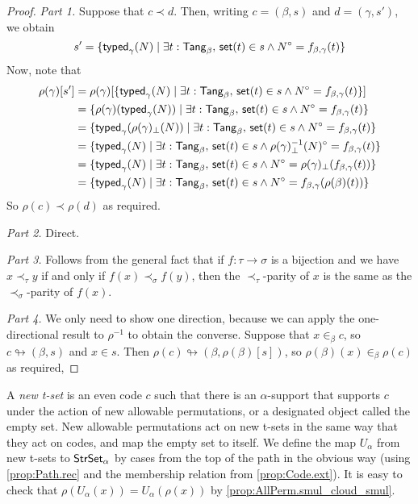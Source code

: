 \begin{proof}
  \emph{Part 1.}
  Suppose that \( c \prec d \).
  Then, writing \( c = (\beta, s) \) and \( d = (\gamma, s') \), we obtain
  \[ s' = \{ \operatorname{\mathsf{typed}}_\gamma(N) \mid \exists t : \mathsf{Tang}_\beta,\, \operatorname{\mathsf{set}}(t) \in s \wedge N^\circ = f_{\beta,\gamma}(t) \} \]
  Now, note that
  \begin{align*}
    \rho(\gamma)[s']
    &= \rho(\gamma)[\{ \operatorname{\mathsf{typed}}_\gamma(N) \mid \exists t : \mathsf{Tang}_\beta,\, \operatorname{\mathsf{set}}(t) \in s \wedge N^\circ = f_{\beta,\gamma}(t) \}] \\
    &= \{ \rho(\gamma)(\operatorname{\mathsf{typed}}_\gamma(N)) \mid \exists t : \mathsf{Tang}_\beta,\, \operatorname{\mathsf{set}}(t) \in s \wedge N^\circ = f_{\beta,\gamma}(t) \} \\
    &= \{ \operatorname{\mathsf{typed}}_\gamma(\rho(\gamma)_\bot(N)) \mid \exists t : \mathsf{Tang}_\beta,\, \operatorname{\mathsf{set}}(t) \in s \wedge N^\circ = f_{\beta,\gamma}(t) \} \\
    &= \{ \operatorname{\mathsf{typed}}_\gamma(N) \mid \exists t : \mathsf{Tang}_\beta,\, \operatorname{\mathsf{set}}(t) \in s \wedge \rho(\gamma)_\bot^{-1}(N)^\circ = f_{\beta,\gamma}(t) \} \\
    &= \{ \operatorname{\mathsf{typed}}_\gamma(N) \mid \exists t : \mathsf{Tang}_\beta,\, \operatorname{\mathsf{set}}(t) \in s \wedge N^\circ = \rho(\gamma)_\bot(f_{\beta,\gamma}(t)) \} \\
    &= \{ \operatorname{\mathsf{typed}}_\gamma(N) \mid \exists t : \mathsf{Tang}_\beta,\, \operatorname{\mathsf{set}}(t) \in s \wedge N^\circ = f_{\beta,\gamma}(\rho(\beta)(t)) \}
  \end{align*}
  So \( \rho(c) \prec \rho(d) \) as required.

  \emph{Part 2.}
  Direct.

  \emph{Part 3.}
  Follows from the general fact that if \( f : \tau \to \sigma \) is a bijection and we have \( x \prec_\tau y \) if and only if \( f(x) \prec_\sigma f(y) \), then the \( \prec_\tau \)-parity of \( x \) is the same as the \( \prec_\sigma \)-parity of \( f(x) \).

  \emph{Part 4.}
  We only need to show one direction, because we can apply the one-directional result to \( \rho^{-1} \) to obtain the converse.
  Suppose that \( x \in_\beta c \), so \( c \looparrowright (\beta, s) \) and \( x \in s \).
  Then \( \rho(c) \looparrowright (\beta, \rho(\beta)[s]) \), so \( \rho(\beta)(x) \in_\beta \rho(c) \) as required,
\end{proof}
\begin{definition}
  \label{def:NewTSet}
  A \emph{new t-set} is an even code \( c \) such that there is an \( \alpha \)-support that supports \( c \) under the action of new allowable permutations, or a designated object called the empty set.
  New allowable permutations act on new t-sets in the same way that they act on codes, and map the empty set to itself.
  We define the map \( U_\alpha \) from new t-sets to \( \mathsf{StrSet}_\alpha \) by cases from the top of the path in the obvious way (using \cref{prop:Path.rec} and the membership relation from \cref{prop:Code.ext}).
  It is easy to check that \( \rho(U_\alpha(x)) = U_\alpha(\rho(x)) \) by \cref{prop:AllPerm.smul_cloud_smul}.
\end{definition}
